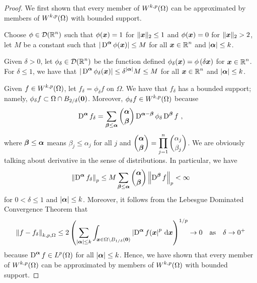 \begin{proof}
 We first shown that every member of
$\displaystyle W^{k,p}(\Omega)$ can be approximated by members of
$\displaystyle W^{k,p}(\Omega)$ with bounded support.

Choose $\displaystyle \phi\in \mathcal{D}(\mathbb{R}^n)$ such that
$\phi({\bm{x}}) = 1$ for $\|{\bm{x}}\|_2 \leq 1$ and
$\phi({\bm{x}}) = 0$ for $\|{\bm{x}}\|_2 > 2$, let $M$ be a constant such
that $\displaystyle |\operatorname{D}^{{\bm{\alpha}}}\phi({\bm{x}})| \leq M$ for all
$\displaystyle {\bm{x}} \in \mathbb{R}^n$ and
$|{\bm{\alpha}}| \leq k$.

Given $\delta >0$, let $\displaystyle \phi_\delta \in \mathcal{D}(\mathbb{R}^n)$ be
the function defined
$\displaystyle \phi_\delta({\bm{x}}) = \phi\left(\delta {\bm{x}}\right)$
for $\displaystyle {\bm{x}} \in \mathbb{R}^n$.  For $\delta \leq 1$, we have that
$\displaystyle |\operatorname{D}^{{\bm{\alpha}}} \phi_\delta({\bm{x}})| \leq
\delta^{|{\bm{\alpha}}|} M \leq M$ for all
$\displaystyle {\bm{x}} \in \mathbb{R}^n$ and $|{\bm{\alpha}}| \leq k$.

Given $\displaystyle f \in W^{k,p}(\Omega)$, let
$f_\delta = \phi_\delta f$ on $\Omega$.  We have that $f_\delta$ has a bounded
support; namely,
$\displaystyle \phi_\delta f \subset \Omega \cap B_{2/\delta}({\bm{0}})$.
Moreover, $\displaystyle \phi_\delta f \in W^{k,p}(\Omega)$ because
\[
\diff^{\VEC{\alpha}} f_\delta = \sum_{\VEC{\beta}\leq \VEC{\alpha}}
\binom{\VEC{\alpha}}{\VEC{\beta}}
\diff^{\VEC{\alpha}-\VEC{\beta}} \phi_{\delta} \diff^{\VEC{\beta}} f \ ,
\]
where ${\bm{\beta}} \leq {\bm{\alpha}}$ means $\beta_j \leq \alpha_j$ for all $j$
and $\displaystyle \binom{{\bm{\alpha}}}{{\bm{\beta}}} = 
\prod_{j=1}^n \binom{\alpha_j}{\beta_j}$.  We are obviously talking
about derivative in the sense of distributions.
In particular, we have
\[
\left\| \operatorname{D}^{{\bm{\alpha}}} f_\delta \right\|_p
\leq M \sum_{{\bm{\beta}}\leq {\bm{\alpha}}} \binom{{\bm{\alpha}}}{{\bm{\beta}}}
\left\| \operatorname{D}^{{\bm{\beta}}} f \right\|_p < \infty
\]
for $0 < \delta \leq 1$ and $|{\bm{\alpha}}| \leq k$.  Moreover, it follows
from the Lebesgue Dominated Convergence Theorem that
\[
\left\| f - f_\delta \right\|_{k,p,\Omega}
\leq 2 \left(
\sum_{|{\bm{\alpha}}|\leq k} \int_{{\bm{x}} \in \Omega \setminus B_{1/\delta}({\bm{0}})}
\left| \operatorname{D}^{{\bm{\alpha}}} f({\bm{x}} \right|^p \,\mathrm{d}{{\bm{x}}} \right)^{1/p} \to 0 
\quad \text{as} \quad \delta \to 0^+
\]
because $\displaystyle \operatorname{D}^{{\bm{\alpha}}}f \in L^p(\Omega)$ for all
$|{\bm{\alpha}}| \leq k$.  Hence, we have shown that every member of
$\displaystyle W^{k,p}(\Omega)$ can be approximated by members of
$\displaystyle W^{k,p}(\Omega)$ with bounded support.


\end{proof}
